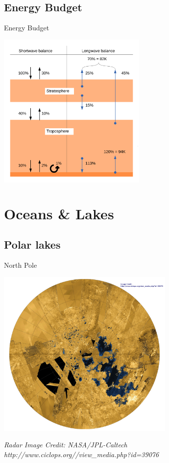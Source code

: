 \documentclass[xcolor=dvipsnames,beamer]{beamer} %
\begin{document}
\subsection{Energy Budget}
\begin{frame}[fragile]{Energy Budget}

\begin{center}
 \includegraphics[width=7.3cm]{images/energybalance}
\end{center}
\end{frame}

\section{Oceans \& Lakes}
\subsection{Polar lakes}
\begin{frame}[fragile]{North Pole}

\begin{center}
  \includegraphics[width=8.7cm]{images/TitanNorthPole}
\end{center}
{\tiny \it Radar Image Credit: NASA/JPL-Caltech\\http://www.ciclops.org//view\_media.php?id=39076}
\end{frame}
\end{document}

